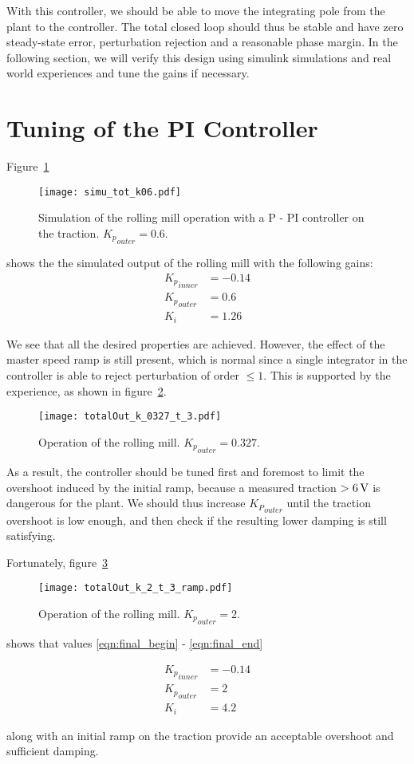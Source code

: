 With this controller, we should be able to move the integrating pole from the plant to the controller. The total closed loop should thus be stable and have zero steady-state error, perturbation rejection and a reasonable phase margin. In the following section, we will verify this design using simulink simulations and real world experiences and tune the gains if necessary.

\section{Tuning of the PI Controller}
Figure~\ref{fig:simu_tot_k06}
\begin{figure}[htbp]
  \centering
  \texttt{[image: simu\_tot\_k06.pdf]}
  \caption{Simulation of the rolling mill operation with a P - PI controller on the traction. ${K_p}_{outer} = 0.6$.\label{fig:simu_tot_k06}}
\end{figure}
shows the the simulated output of the rolling mill with the following gains:
\begin{align*}
  {K_p}_{inner} &= -0.14\\
  {K_p}_{outer} &= 0.6\\
  K_i &= 1.26
\end{align*}

We see that all the desired properties are achieved. However, the effect of the master speed ramp is still present, which is normal since a single integrator in the controller is able to reject perturbation of order $\leq 1$. This is supported by the experience, as shown in figure~\ref{fig:totalOut_k_0327_t_3}.
\begin{figure}[htbp]
  \centering
  \texttt{[image: totalOut\_k\_0327\_t\_3.pdf]}
  \caption{Operation of the rolling mill. ${K_p}_{outer} = 0.327$.\label{fig:totalOut_k_0327_t_3}}
\end{figure}

As a result, the controller should be tuned first and foremost to limit the overshoot induced by the initial ramp, because a measured traction $>\nobreak\SI{6}{V}$ is dangerous for the plant. We should thus increase ${K_P}_{outer}$ until the traction overshoot is low enough, and then check if the resulting lower damping is still satisfying.

Fortunately, figure~\ref{fig:totalOut_k_2_t_3}
\begin{figure}[htbp]
  \centering
  \texttt{[image: totalOut\_k\_2\_t\_3\_ramp.pdf]}
  \caption{Operation of the rolling mill. ${K_p}_{outer} = 2$.\label{fig:totalOut_k_2_t_3}}
\end{figure}
shows that values \ref{eqn:final_begin} - \ref{eqn:final_end}
\begin{figure*}[htbp]
\begin{align}
  {K_p}_{inner} &= -0.14\label{eqn:final_begin}\\
  {K_p}_{outer} &= 2\\
  K_i &= 4.2\label{eqn:final_end}
\end{align}
\end{figure*}
along with an initial ramp on the traction provide an acceptable overshoot and sufficient damping.
